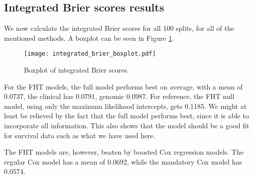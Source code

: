 


\subsection{Integrated Brier scores results}
We now calculate the integrated Brier scores for all 100 splits, for all of the mentioned methods.
A boxplot can be seen in Figure \ref{fig:neuroblastoma-integrated-brier}.
\begin{figure}
\caption{Boxplot of integrated Brier scores.}
\label{fig:neuroblastoma-integrated-brier}
\centering
\texttt{[image: integrated\_brier\_boxplot.pdf]}
\end{figure}
For the FHT models, the full model performs best on average, with a mean of 0.0737, the clinical has 0.0791, genomic 0.0987.
For reference, the FHT null model, using only the maximum likelihood intercepts, gets 0.1185.
We might at least be relieved by the fact that the full model performs best, since it is able to incorporate all information.
This also shows that the model should be a good fit for survival data such as what we have used here.

The FHT models are, however, beaten by boosted Cox regression models.
The regular Cox model has a mean of 0.0692, while the mandatory Cox model has 0.0574.